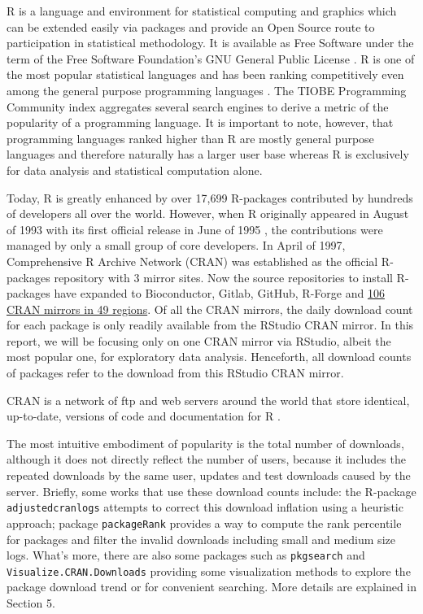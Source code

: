 \documentclass[
]{book}
\begin{document}
R is a language and environment for statistical computing and graphics which can be extended easily via packages and provide an Open Source route to participation in statistical methodology. It is available as Free Software under the term of the Free Software Foundation's GNU General Public License \autocite{gnu}. R is one of the most popular statistical languages and has been ranking competitively even among the general purpose programming languages \autocite[peaking 8th in August 2020 in][]{tiobe}. The TIOBE Programming Community index aggregates several search engines to derive a metric of the popularity of a programming language. It is important to note, however, that programming languages ranked higher than R are mostly general purpose languages and therefore naturally has a larger user base whereas R is exclusively for data analysis and statistical computation alone.

Today, R is greatly enhanced by over 17,699 R-packages contributed by hundreds of developers all over the world. However, when R originally appeared in August of 1993 with its first official release in June of 1995 \autocite{Ikaha1998}, the contributions were managed by only a small group of core developers. In April of 1997, Comprehensive R Archive Network (CRAN) was established as the official R-packages repository with 3 mirror sites. Now the source repositories to install R-packages have expanded to Bioconductor, Gitlab, GitHub, R-Forge and \href{https://cran.r-project.org/mirmon_report.html}{106 CRAN mirrors in 49 regions}. Of all the CRAN mirrors, the daily download count for each package is only readily available from the RStudio CRAN mirror. In this report, we will be focusing only on one CRAN mirror via RStudio, albeit the most popular one, for exploratory data analysis. Henceforth, all download counts of packages refer to the download from this RStudio CRAN mirror.

CRAN is a network of ftp and web servers around the world that store identical, up-to-date, versions of code and documentation for R \autocite{CRAN}.

The most intuitive embodiment of popularity is the total number of downloads, although it does not directly reflect the number of users, because it includes the repeated downloads by the same user, updates and test downloads caused by the server. Briefly, some works that use these download counts include: the R-package \texttt{adjustedcranlogs} \autocite{adjustedcranlogs} attempts to correct this download inflation using a heuristic approach; package \texttt{packageRank} \autocite{packageRank} provides a way to compute the rank percentile for packages and filter the invalid downloads including small and medium size logs. What's more, there are also some packages such as \texttt{pkgsearch}\autocite{pkgsearch} and \texttt{Visualize.CRAN.Downloads}\autocite{VisualizeCRANDownloads} providing some visualization methods to explore the package download trend or for convenient searching. More details are explained in Section 5.
\end{document}
